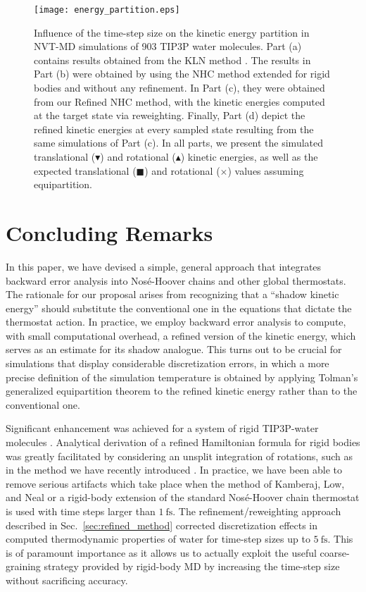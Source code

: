 \documentclass[
	aip,
	jcp,
	reprint,
]{revtex4-1}
\begin{document}
\begin{figure*}
	\texttt{[image: energy\_partition.eps]}
		\caption{Influence of the time-step size on the kinetic energy partition in NVT-MD simulations of 903 TIP3P \cite{Jorgensen_1983} water molecules.
		Part (a) contains results obtained from the KLN method \cite{Kamberaj_2005}.
		The results in Part (b) were obtained by using the NHC method \cite{Martyna_1996} extended for rigid bodies and without any refinement.
		In Part (c), they  were obtained from our Refined NHC \cite{Martyna_1996} method, with the kinetic energies computed at the target state via reweighting.
		Finally, Part (d) depict the refined kinetic energies at every sampled state resulting from the same simulations of Part (c).
		In all parts, we present the simulated translational ($\blacktriangledown$) and rotational ($\blacktriangle$) kinetic energies, as well as the expected translational ($\blacksquare$) and rotational ($\times$) values assuming equipartition.}
	\label{fig:energy_partition}
\end{figure*}

\section{Concluding Remarks}
\label{sec:conclusion}

In this paper, we have devised a simple, general approach that integrates backward error analysis into Nos\'{e}-Hoover chains and other global thermostats.
The rationale for our proposal arises from recognizing that a ``shadow kinetic energy'' should substitute the conventional one in the equations that dictate the thermostat action.
In practice, we employ backward error analysis to compute, with small computational overhead, a refined version of the kinetic energy, which serves as an estimate for its shadow analogue.
This turns out to be crucial for simulations that display considerable discretization errors, in which a more precise definition of the simulation temperature \cite{Eastwood_2010} is obtained by applying Tolman's generalized equipartition theorem to the refined kinetic energy rather than to the conventional one.

Significant enhancement was achieved for a system of rigid TIP3P-water molecules \cite{Jorgensen_1983}.
Analytical derivation of a refined Hamiltonian formula for rigid bodies was greatly facilitated by considering an unsplit integration of rotations, such as in the method we have recently introduced \cite{Silveira_2017}.
In practice, we have been able to remove serious artifacts which take place when the method of Kamberaj, Low, and Neal \cite{Kamberaj_2005} or a rigid-body extension of the standard Nos\'{e}-Hoover chain thermostat \cite{Martyna_1992, Martyna_1996} is used with time steps larger than $1~\text{fs}$.
The refinement/reweighting approach described in Sec.~\ref{sec:refined_method} corrected discretization effects in computed thermodynamic properties of water for time-step sizes up to $5~\text{fs}$. This is of paramount importance as it allows us to actually exploit the useful coarse-graining strategy provided by rigid-body MD by increasing the time-step size without sacrificing accuracy.
\end{document}
